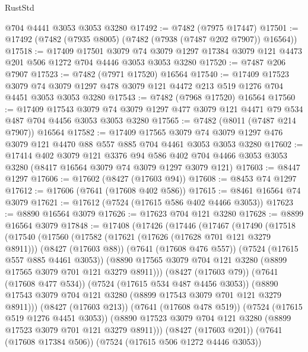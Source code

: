 \begin{lexlean}{RustStd}
\begin{coremodule}
    @704
    @4441
    @3053
    @3053
    @3280
@17492 := @7482 (@7975 @17447)
@17501 := @17492 (@7482 (@7935 @8005) (@7482 (@7938 (@7487 @202 @7907)) @16564))
@17518 := @17409
    @17501
    @3079
    @74
    @3079
    @1297
    @17384
    @3079
    @121
    @4473
    @201
    @506
    @1272
    @704
    @4446
    @3053
    @3053
    @3280
@17520 := @7487 @206 @7907
@17523 := @7482 (@7971 @17520) @16564
@17540 := @17409
    @17523
    @3079
    @74
    @3079
    @1297
    @478
    @3079
    @121
    @4472
    @213
    @519
    @1276
    @704
    @4451
    @3053
    @3053
    @3280
@17543 := @7482 (@7968 @17520) @16564
@17560 := @17409
    @17543
    @3079
    @74
    @3079
    @1297
    @477
    @3079
    @121
    @4471
    @79
    @534
    @487
    @704
    @4456
    @3053
    @3053
    @3280
@17565 := @7482 (@8011 (@7487 @214 @7907)) @16564
@17582 := @17409
    @17565
    @3079
    @74
    @3079
    @1297
    @476
    @3079
    @121
    @4470
    @88
    @557
    @885
    @704
    @4461
    @3053
    @3053
    @3280
@17602 := @17414
    @402
    @3079
    @121
    @3376
    @94
    @586
    @402
    @704
    @4466
    @3053
    @3053
    @3280
    (@8417 @16564 @3079 @74 @3079 @1297 @3079 @121)
@17603 := @8447 @1297
@17606 := @17602 (@8427 (@17603 @94))
@17608 := @8453 @74 @1297
@17612 := @17606 (@7641 (@17608 @402 @586))
@17615 := @8461 @16564 @74 @3079
@17621 := @17612 (@7524 (@17615 @586 @402 @4466 @3053))
@17623 := @8890 @16564 @3079
@17626 := @17623 @704 @121 @3280
@17628 := @8899 @16564 @3079
@17848 := @17408
    (@17426
      (@17446
        (@17467
          (@17490
            (@17518
              (@17540
                (@17560
                  (@17582
                    (@17621 (@17626 (@17628 @701 @121 @3279 @8911)))
                    (@8427 (@17603 @88))
                    (@7641 (@17608 @476 @557))
                    (@7524 (@17615 @557 @885 @4461 @3053))
                    (@8890 @17565 @3079 @704 @121 @3280 (@8899 @17565 @3079 @701 @121 @3279 @8911)))
                  (@8427 (@17603 @79))
                  (@7641 (@17608 @477 @534))
                  (@7524 (@17615 @534 @487 @4456 @3053))
                  (@8890 @17543 @3079 @704 @121 @3280 (@8899 @17543 @3079 @701 @121 @3279 @8911)))
                (@8427 (@17603 @213))
                (@7641 (@17608 @478 @519))
                (@7524 (@17615 @519 @1276 @4451 @3053))
                (@8890 @17523 @3079 @704 @121 @3280 (@8899 @17523 @3079 @701 @121 @3279 @8911)))
              (@8427 (@17603 @201))
              (@7641 (@17608 @17384 @506))
              (@7524 (@17615 @506 @1272 @4446 @3053))

\end{coremodule}
\end{lexlean}
